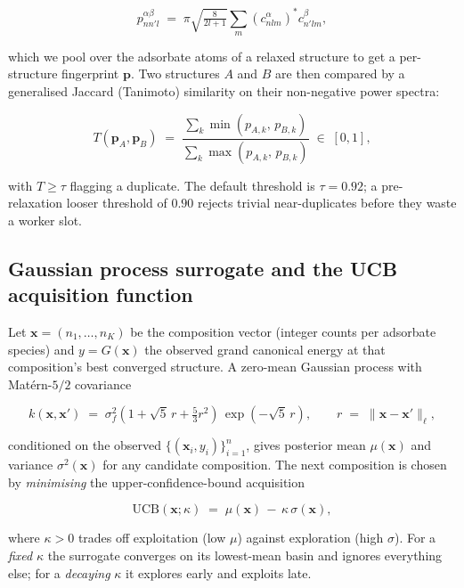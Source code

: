 \documentclass[11pt,letterpaper]{article}
\begin{document}
\begin{equation}
p^{\alpha\beta}_{nn'l}
  \;=\;
  \pi \sqrt{\tfrac{8}{2l+1}} \sum_m
    (c^\alpha_{nlm})^* c^\beta_{n'lm},
\end{equation}

which we pool over the adsorbate atoms of a relaxed structure to get a
per-structure fingerprint $\mathbf{p}$. Two structures $A$ and $B$ are
then compared by a generalised Jaccard (Tanimoto) similarity on their
non-negative power spectra:

\begin{equation}
T(\mathbf{p}_A, \mathbf{p}_B)
  \;=\;
  \frac{\sum_k \min(p_{A,k},\, p_{B,k})}
       {\sum_k \max(p_{A,k},\, p_{B,k})}
  \;\in\;[0,1],
\end{equation}

with $T \geq \tau$ flagging a duplicate. The default threshold is
$\tau = 0.92$; a pre-relaxation looser threshold of $0.90$ rejects
trivial near-duplicates before they waste a worker slot.

\subsection{Gaussian process surrogate and the UCB acquisition function}

Let $\mathbf{x} = (n_1,\dots,n_K)$ be the composition vector (integer
counts per adsorbate species) and $y = G(\mathbf{x})$ the observed
grand canonical energy at that composition's best converged structure.
A zero-mean Gaussian process with Mat{\'e}rn-$5/2$ covariance

\begin{equation}
k(\mathbf{x},\mathbf{x}')
  \;=\;
  \sigma_f^2 \left(1 + \sqrt{5}\, r + \tfrac{5}{3} r^2 \right)\,
  \exp\!\left(-\sqrt{5}\, r\right),
  \qquad
  r \;=\; \| \mathbf{x} - \mathbf{x}' \|_\ell,
\end{equation}

conditioned on the observed $\{(\mathbf{x}_i, y_i)\}_{i=1}^{n}$, gives
posterior mean $\mu(\mathbf{x})$ and variance $\sigma^2(\mathbf{x})$ for
any candidate composition. The next composition is chosen by
\emph{minimising} the upper-confidence-bound acquisition

\begin{equation}
\label{eq:ucb}
\text{UCB}(\mathbf{x};\kappa)
  \;=\;
  \mu(\mathbf{x}) \,-\, \kappa\,\sigma(\mathbf{x}),
\end{equation}

where $\kappa > 0$ trades off exploitation (low $\mu$) against
exploration (high $\sigma$). For a \emph{fixed} $\kappa$ the surrogate
converges on its lowest-mean basin and ignores everything else; for a
\emph{decaying} $\kappa$ it explores early and exploits late.
\end{document}
